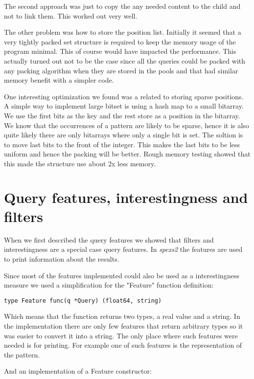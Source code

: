 The second approach was just to copy the any needed content to the child and not to link them. This worked out very well.

The other problem was how to store the position list. Initially it seemed that a very tightly packed set structure is required to keep the memory usage of the program minimal. This of course would have impacted the performance. This actually turned out not to be the case since all the queries could be packed with any packing algorithm when they are stored in the pools and that had similar memory benefit with a simpler code.

One interesting optimization we found was a related to storing sparse positions. A simple way to implement large bitset is using a hash map to a small bitarray. We use the first bits as the key and the rest store as a position in the bitarray. We know that the occurrences of a pattern are likely to be sparse, hence it is also quite likely there are only bitarrays where only a single bit is set. The soltion is to move last bits to the front of the integer. This makes the last bits to be less uniform and hence the packing will be better. Rough memory testing showed that this made the structure use about 2x less memory.

\section{Query features, interestingness and filters}

When we first described the query features we showed that filters and interestingness are a special case query features. In \emph{spexs2} the features are used to print information about the results.

Since most of the features implemented could also be used as a interestingness measure we used a simplification for the "Feature" function definition:

\begin{lstlisting}
type Feature func(q *Query) (float64, string)
\end{lstlisting}

Which means that the function returns two types, a real value and a string. In the implementation there are only few features that return arbitrary types so it was easier to convert it into a string. The only place where such features were needed is for printing. For example one of such features is the representation of the pattern.

And an implementation of a Feature constructor:

